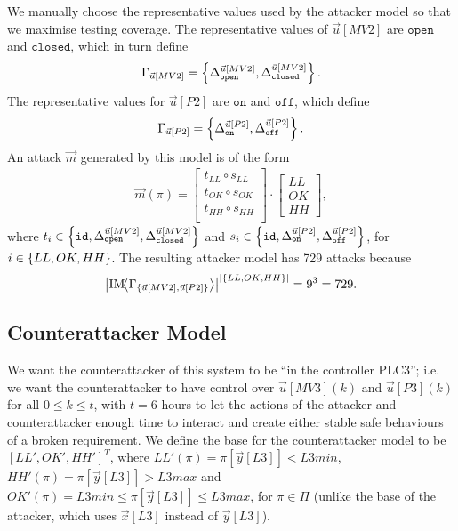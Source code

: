 {We manually choose the representative values used by the attacker model so that we maximise testing coverage. The representative values of $\vec{u}[MV2]$ are $\texttt{open}$ and $\texttt{closed}$, which in turn define 
\begin{align*}
  \Gamma_{\vec{u}[MV2]}=\left\{{\Delta}^{\vec{u}[MV2]}_{\texttt{open}}, {\Delta}^{\vec{u}[MV2]}_{\texttt{closed}}\right\}.
\end{align*}
The representative values for $\vec{u}[P2]$ are $\texttt{on}$ and $\texttt{off}$, which define 
\begin{align*}
  \Gamma_{\vec{u}[P2]}=\left\{{\Delta}^{\vec{u}[P2]}_{\texttt{on}}, {\Delta}^{\vec{u}[P2]}_{\texttt{off}}\right\}.
\end{align*}
An attack $\vec{m}$ generated by this model is of the form
\begin{align*}
  \vec{m}(\pi)=
  \begin{bmatrix}
    t_{LL}\circ s_{LL} \\
    t_{OK}\circ s_{OK} \\
    t_{HH}\circ s_{HH} \\
  \end{bmatrix}
  \cdot
  \begin{bmatrix}
    LL \\
    OK \\
    HH
  \end{bmatrix},
\end{align*} 
where $t_i\in \left\{{\texttt{id}},{\Delta}^{\vec{u}[MV2]}_{\texttt{open}}, {\Delta}^{\vec{u}[MV2]}_{\texttt{closed}}\right\}$ and  $s_i\in\left\{{\texttt{id}},{\Delta}^{\vec{u}[P2]}_{\texttt{on}}, {\Delta}^{\vec{u}[P2]}_{\texttt{off}}\right\}$, for $i\in \left\{LL,OK,HH\right\}$. The resulting attacker model has 729 attacks because
 \begin{align*}
  \left| \text{IM}\!{{\left<\Gamma_{\left\{\vec{u}[MV2],\vec{u}[P2]\right\}}\right>}}\right|^{\left|\left\{{LL},{OK},{HH}\right\}\right|}=9^3=729.
\end{align*}

\subsection{Counterattacker Model}
We want the counterattacker of this system to be ``in the controller PLC3''; i.e. we want the counterattacker to have control over $\vec{u}[MV3](k)$ and $\vec{u}[P3](k)$ for all $0\leq k\leq t$, with $t=6$ hours to let the actions of the attacker and counterattacker enough time to interact and create either stable safe behaviours of a broken requirement. We define the base for the counterattacker model to be $[LL', OK', HH']^T$, where ${LL'}(\pi)=\pi[\vec{y}[L3]]<L3min$, ${HH'}(\pi)=\pi[\vec{y}[L3]]>L3max$ and ${OK'}(\pi)=L3min \leq \pi[\vec{y}[L3]]\leq L3max$, for $\pi \in \Pi$ (unlike the base of the attacker, which uses $\vec{x}[L3]$ instead of $\vec{y}[L3]$). %

}
